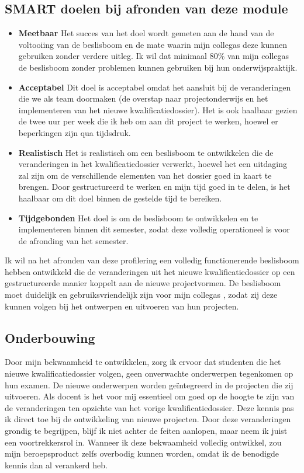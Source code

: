 \subsection{SMART doelen bij afronden van deze module}
\begin{itemize}
    \item \textbf {Meetbaar}
Het succes van het doel wordt gemeten aan de hand van de voltooiing van de beslisboom en de mate waarin mijn collega\textquotesingle s
 deze kunnen gebruiken zonder verdere uitleg. Ik wil dat minimaal 80\% van mijn collega\textquotesingle s
 de beslisboom zonder problemen kunnen gebruiken bij hun onderwijspraktijk.

    \item \textbf {Acceptabel}
Dit doel is acceptabel omdat het aansluit bij de veranderingen die we als team doormaken (de overstap naar projectonderwijs en het implementeren van het nieuwe kwalificatiedossier). Het is ook haalbaar gezien de twee uur per week die ik heb om aan dit project te werken, hoewel er beperkingen zijn qua tijdsdruk.

    \item  \textbf {Realistisch}
Het is realistisch om een beslisboom te ontwikkelen die de veranderingen in het kwalificatiedossier verwerkt, hoewel het een uitdaging zal zijn om de verschillende elementen van het dossier goed in kaart te brengen. Door gestructureerd te werken en mijn tijd goed in te delen, is het haalbaar om dit doel binnen de gestelde tijd te bereiken.

    \item \textbf {Tijdgebonden}
Het doel is om de beslisboom te ontwikkelen en te implementeren binnen dit semester, zodat deze volledig operationeel is voor de afronding van het semester.
    
\end{itemize}

Ik wil na het afronden van deze profilering een volledig functionerende beslisboom hebben ontwikkeld die de veranderingen uit het nieuwe kwalificatiedossier op een gestructureerde manier koppelt aan de nieuwe projectvormen. De beslisboom moet duidelijk en gebruiksvriendelijk zijn voor mijn collega\textquotesingle s
, zodat zij deze kunnen volgen bij het ontwerpen en uitvoeren van hun projecten.



\subsection{Onderbouwing}
Door mijn bekwaamheid te ontwikkelen, zorg ik ervoor dat studenten die het nieuwe kwalificatiedossier volgen, geen onverwachte onderwerpen tegenkomen op hun examen. De nieuwe onderwerpen worden geïntegreerd in de projecten die zij uitvoeren. Als docent is het voor mij essentieel om goed op de hoogte te zijn van de veranderingen ten opzichte van het vorige kwalificatiedossier. Deze kennis pas ik direct toe bij de ontwikkeling van nieuwe projecten. Door deze veranderingen grondig te begrijpen, blijf ik niet achter de feiten aanlopen, maar neem ik juist een voortrekkersrol in. Wanneer ik deze bekwaamheid volledig ontwikkel, zou mijn beroepsproduct zelfs overbodig kunnen worden, omdat ik de benodigde kennis dan al verankerd heb.

